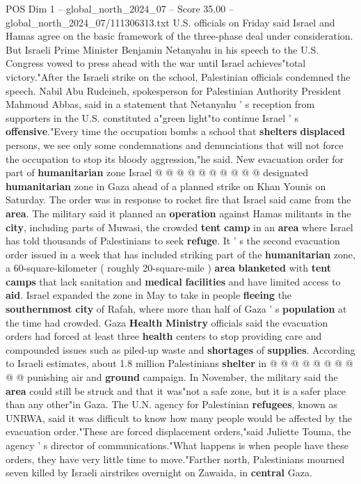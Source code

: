\begin{textsample}{POS Dim 1 – global\_north\_2024\_07 – Score 35.00 – global\_north\_2024\_07/111306313.txt}
U.S. officials on Friday said Israel and Hamas agree on the basic framework of the three-phase deal under consideration.
But Israeli Prime Minister Benjamin Netanyahu in his speech to the U.S.
Congress vowed to press ahead with the war until Israel achieves"total victory."After the Israeli strike on the school, Palestinian officials condemned the speech.
Nabil Abu Rudeineh, spokesperson for Palestinian Authority President Mahmoud Abbas, said in a statement that Netanyahu ' s reception from supporters in the U.S. constituted a"green light"to continue Israel ' s \textbf{offensive}."Every time the occupation bombs a school that \textbf{shelters} \textbf{displaced} persons, we see only some condemnations and denunciations that will not force the occupation to stop its bloody aggression,"he said.
New evacuation order for part of \textbf{humanitarian} zone Israel @ @ @ @ @ @ @ @ @ @ designated \textbf{humanitarian} zone in Gaza ahead of a planned strike on Khan Younis on Saturday.
The order was in response to rocket fire that Israel said came from the \textbf{area}.
The military said it planned an \textbf{operation} against Hamas militants in the \textbf{city}, including parts of Muwasi, the crowded \textbf{tent} \textbf{camp} in an \textbf{area} where Israel has told thousands of Palestinians to seek \textbf{refuge}.
It ' s the second evacuation order issued in a week that has included striking part of the \textbf{humanitarian} zone, a 60-square-kilometer ( roughly 20-square-mile ) \textbf{area} \textbf{blanketed} with \textbf{tent} \textbf{camps} that lack sanitation and \textbf{medical} \textbf{facilities} and have limited access to \textbf{aid}.
Israel expanded the zone in May to take in people \textbf{fleeing} the \textbf{southernmost} \textbf{city} of Rafah, where more than half of Gaza ' s \textbf{population} at the time had crowded.
Gaza \textbf{Health} \textbf{Ministry} officials said the evacuation orders had forced at least three \textbf{health} centers to stop providing care and compounded issues such as piled-up waste and \textbf{shortages} of \textbf{supplies}.
According to Israeli estimates, about 1.8 million Palestinians \textbf{shelter} in @ @ @ @ @ @ @ @ @ @ punishing air and \textbf{ground} campaign.
In November, the military said the \textbf{area} could still be struck and that it was"not a safe zone, but it is a safer place than any other"in Gaza.
The U.N. agency for Palestinian \textbf{refugees}, known as UNRWA, said it was difficult to know how many people would be affected by the evacuation order."These are forced displacement orders,"said Juliette Touma, the agency ' s director of communications."What happens is when people have these orders, they have very little time to move."Farther north, Palestinians mourned seven killed by Israeli airstrikes overnight on Zawaida, in \textbf{central} Gaza.

\end{textsample}
